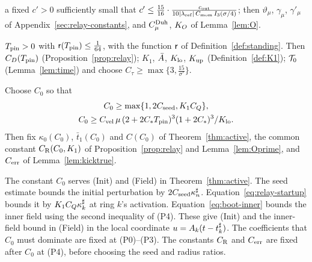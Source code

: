\begin{definition}
\begin{description}[font=\normalfont]
  a fixed $c'>0$ sufficiently small that
  $c'\le\frac{15}{16}\cdot\frac{c_{\mathrm{out}}}{10|\lambda_{\mathrm{ref}}|\,C_{\mathrm{mom}}\,I_{3}(\sigma/4)}$; then
  $\vartheta_\mu$, $\gamma_\mu$, $\gamma'_\mu$ of Appendix~\ref{sec:relay-constants},
  and $C^{\mathrm{Duh}}_\mu$, $K_{O}$ of Lemma~\ref{lem:O}.
\item[\textup{(P3)}] $T_{\mathrm{pin}}>0$ with $\mathsf{r}(T_{\mathrm{pin}})\le\frac1{64}$, with the function
  $\mathsf{r}$ of Definition~\ref{def:standing}. Then $C_D(T_{\mathrm{pin}})$
  (Proposition~\ref{prop:relay}); $K_1$, $\bar A$, $K_{\mathrm{lo}}$, $K_{\mathrm{up}}$
  (Definition~\ref{def:K1});
  $\mathcal{T}_0$ (Lemma~\ref{lem:time}) and
  choose $C_\tau\ge\max\{3,\frac{15}{\sigma'}\}$.
\item[\textup{(P4)}] Choose $C_0$ so that
  \begin{equation}
  \label{eq:param-C0}
  \begin{gathered}
  C_0\ge\max\{1,2C_{\mathrm{seed}},K_1C_Q\},\\
  C_0\ge C_{\mathrm{vel}} \,\mu\,(2+2C_{*}T_{\mathrm{pin}})^3(1+2C_{*})^3/K_{\mathrm{lo}}.
  \end{gathered}
  \end{equation}
  Then fix $\kappa_0(C_0)$, $\bar t_1(C_0)$ and $C(C_0)$ of
  Theorem~\ref{thm:active}, the common constant $C_{\mathrm R}(C_0,K_1)$ of
  Proposition~\ref{prop:relay} and Lemma~\ref{lem:Oprime}, and $C_{\mathrm{err}}$ of
  Lemma~\ref{lem:kicktrue}.
\end{description}
\end{definition}

The constant $C_0$ serves (Init) and (Field) in Theorem~\ref{thm:active}.
The seed estimate bounds the initial perturbation by $2C_{\mathrm{seed}}\kappa^\sharp_n$.
Equation~\eqref{eq:relay-startup}
bounds it by $K_1C_Q\kappa^\sharp_k$ at ring $k$'s activation.
Equation~\eqref{eq:boot-inner} bounds the inner field using the second
inequality of (P4). These give (Init) and the inner-field bound in (Field) in the local coordinate
$u=A_k(t-t^\sharp_k)$.
The coefficients that $C_0$ must dominate are fixed at (P0)--(P3).
The constants $C_{\mathrm R}$ and $C_{\mathrm{err}}$ are fixed after $C_0$ at (P4), before
choosing the seed and radius ratios.


